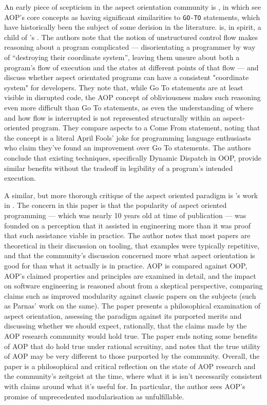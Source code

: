 An early piece of scepticism in the aspect orientation community is
\cite{Constantinides04aopconsidered}, in which
\citeauthor{Constantinides04aopconsidered} see AOP's core concepts as having
significant similarities to \lstinline{GO-TO} statements, which have
historically been the subject of some derision in the literature.
\cite{Constantinides04aopconsidered} is, in spirit, a child of
\citeauthor{dijkstra1968letters}'s . The authors
note that the notion of unstructured control flow makes reasoning about a
program complicated --- disorientating a programmer by way of ``destroying their
coordinate system'', leaving them unsure about both a program's flow of
execution and the states at different points of that flow --- and discuss
whether aspect orientated programs can have a consistent "coordinate system" for
developers. They note that, while Go To statements are at least visible in
disrupted code, the AOP concept of obliviousness makes such reasoning even more
difficult than Go To statements, as even the understanding of where and how flow
is interrupted is not represented structurally within an aspect-oriented
program. They compare aspects to a Come From statement, noting that the concept
is a literal April Fools' joke for programming language enthusiasts who claim
they've found an improvement over Go To statements. The authors conclude that
existing techniques, specifically Dynamic Dispatch in OOP, provide similar
benefits without the tradeoff in legibility of a program's intended execution.


A similar, but more thorough critique of the aspect oriented paradigm is
\citeauthor{steimann06paradoxical}'s work in \cite{steimann06paradoxical}. The
concern in this paper is that the popularity of aspect oriented programming ---
which was nearly 10 years old at time of publication --- was founded on a
perception that it assisted in engineering more than it was proof that such
assistance viable in practice. The author notes that most papers are theoretical
in their discussion on tooling, that examples were typically repetitive, and
that the community's discussion concerned more what aspect orientation is good
for than what it actually is in practice. AOP is compared against OOP, AOP's
claimed properties and principles are examined in detail, and the impact on
software engineering is reasoned about from a skeptical perspective, comparing
claims such as improved modularity against classic papers on the subjects (such
as Parnas' work on the same). The paper presents a philosophical examination of
aspect orientation, assessing the paradigm against its purported merits and
discussing whether we should expect, rationally, that the claims made by the AOP
research community would hold true. The paper ends noting some benefits of AOP
that do hold true under rational scruitiny, and notes that the true utility of
AOP may be very different to those purported by the community. Overall, the
paper is a philosophical and critical reflection on the state of AOP research
and the community's zeitgeist at the time, where what it is isn't necessarily
consistent with claims around what it's useful for. In particular, the author
sees AOP's promise of unprecedented modularisation as unfulfillable. 

